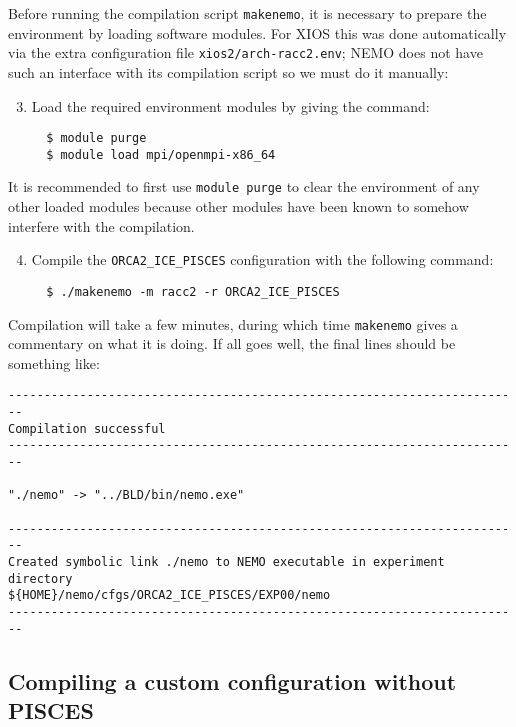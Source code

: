 Before running the compilation script \verb|makenemo|, it is necessary to prepare the environment by loading software modules.
For XIOS this was done automatically via the extra configuration file \verb|xios2/arch-racc2.env|; NEMO does not have such an interface with its compilation script so we must do it manually:

\begin{enumerate}\setcounter{enumi}{2}
    \item Load the required environment modules by giving the command:

\begin{verbatim}
  $ module purge
  $ module load mpi/openmpi-x86_64
\end{verbatim}
\end{enumerate}

It is recommended to first use \verb|module purge| to clear the environment of any other loaded modules because other modules have been known to somehow interfere with the compilation.

\begin{enumerate}\setcounter{enumi}{3}
    \item Compile the \verb|ORCA2_ICE_PISCES| configuration with the following command:
\begin{verbatim}
  $ ./makenemo -m racc2 -r ORCA2_ICE_PISCES
\end{verbatim}
\end{enumerate}

Compilation will take a few minutes, during which time \verb|makenemo| gives a commentary on what it is doing.
If all goes well, the final lines should be something like:

\begingroup\small
\begin{verbatim}
------------------------------------------------------------------------
Compilation successful
------------------------------------------------------------------------

"./nemo" -> "../BLD/bin/nemo.exe"

------------------------------------------------------------------------
Created symbolic link ./nemo to NEMO executable in experiment directory
${HOME}/nemo/cfgs/ORCA2_ICE_PISCES/EXP00/nemo
------------------------------------------------------------------------
\end{verbatim}
\endgroup


\subsection{Compiling a custom configuration without PISCES}
\label{sec:tutorial:subsec:no-pisces}

